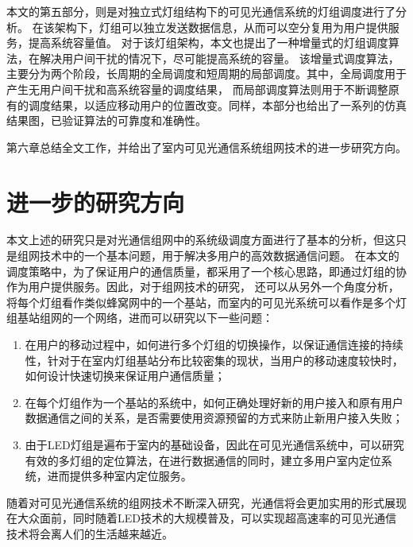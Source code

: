 本文的第五部分，则是对独立式灯组结构下的可见光通信系统的灯组调度进行了分析。
在该架构下，灯组可以独立发送数据信息，从而可以空分复用为用户提供服务，提高系统容量值。
对于该灯组架构，本文也提出了一种增量式的灯组调度算法，在解决用户间干扰的情况下，尽可能提高系统的容量。
该增量式调度算法，主要分为两个阶段，长周期的全局调度和短周期的局部调度。其中，全局调度用于产生无用户间干扰和高系统容量的调度结果，
而局部调度算法则用于不断调整原有的调度结果，以适应移动用户的位置改变。同样，本部分也给出了一系列的仿真结果图，已验证算法的可靠度和准确性。

第六章总结全文工作，并给出了室内可见光通信系统组网技术的进一步研究方向。

\section{进一步的研究方向}
本文上述的研究只是对光通信组网中的系统级调度方面进行了基本的分析，但这只是组网技术中的一个基本问题，用于解决多用户的高效数据通信问题。
在本文的调度策略中，为了保证用户的通信质量，都采用了一个核心思路，即通过灯组的协作为用户提供服务。因此，对于组网技术的研究，
还可以从另外一个角度分析，将每个灯组看作类似蜂窝网中的一个基站，而室内的可见光系统可以看作是多个灯组基站组网的一个网络，进而可以研究以下一些问题：

\begin{enumerate}
    \item 在用户的移动过程中，如何进行多个灯组的切换操作，以保证通信连接的持续性，针对于在室内灯组基站分布比较密集的现状，当用户的移动速度较快时，如何设计快速切换来保证用户通信质量；
    \item 在每个灯组作为一个基站的系统中，如何正确处理好新的用户接入和原有用户数据通信之间的关系，是否需要使用资源预留的方式来防止新用户接入失败；
    \item 由于LED灯组是遍布于室内的基础设备，因此在可见光通信系统中，可以研究有效的多灯组的定位算法，在进行数据通信的同时，建立多用户室内定位系统，进而提供多种室内定位服务。
\end{enumerate}

随着对可见光通信系统的组网技术不断深入研究，光通信将会更加实用的形式展现在大众面前，同时随着LED技术的大规模普及，可以实现超高速率的可见光通信技术将会离人们的生活越来越近。
